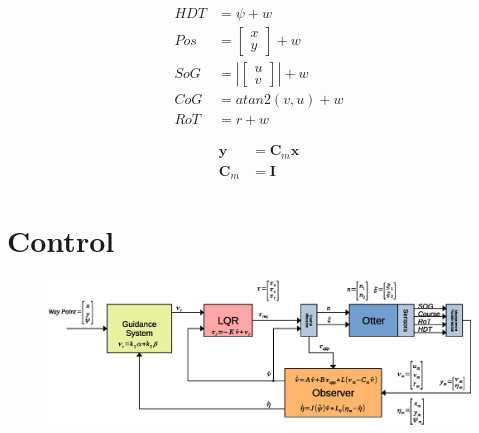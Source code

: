 \documentclass[12pt,a4]{article}
\begin{document}
\begin{align}
	HDT & = \psi + w                                    \\
	Pos & = \begin{bmatrix} x \\ y \end{bmatrix} + w              \\
	SoG & = \left|\begin{bmatrix} u \\ v \end{bmatrix}\right| + w \\
	CoG & = atan2(v,u) + w                              \\
	RoT & = r + w
\end{align}

\begin{align}
	\bm{y}   & = \bm{C}_m \bm{x} \\
	\bm{C}_m & = \bm{I}
\end{align}

\section{Control}
\begin{figure}[H]
	\includegraphics[width = \textwidth]{graphics/BlokDiagram.eps}
	\caption{}
	\label{}
\end{figure}
\end{document}
